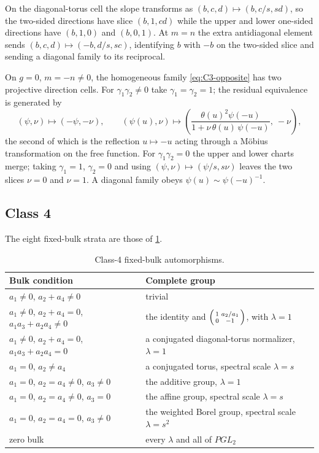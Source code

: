 \documentclass[11pt,reqno]{amsart}
\theoremstyle{plain}
\theoremstyle{definition}
\theoremstyle{remark}
\numberwithin{equation}{section}
\begin{document}
On the diagonal-torus cell the slope transforms as $(b,c,d)\mapsto(b,c/s,sd)$, so
the two-sided directions have slice $(b,1,cd)$ while the upper and lower one-sided
directions have $(b,1,0)$ and $(b,0,1)$. At $m=n$ the extra antidiagonal element
sends $(b,c,d)\mapsto(-b,d/s,sc)$, identifying $b$ with $-b$ on the two-sided
slice and sending a diagonal family to its reciprocal.

On $g=0$, $m=-n\ne0$, the homogeneous family \cref{eq:C3-opposite} has two
projective direction cells. For $\gamma_1\gamma_2\ne0$ take $\gamma_1=\gamma_2=1$;
the residual equivalence is generated by
\begin{equation}
(\psi,\nu)\mapsto(-\psi,-\nu),
\qquad
(\psi(u),\nu)\mapsto
\left(\frac{\theta(u)^2\psi(-u)}{1+\nu\,\theta(u)\,\psi(-u)},\ -\nu\right),
\label{eq:C3-residual}
\end{equation}
the second of which is the reflection $u\mapsto-u$ acting through a Möbius
transformation on the free function. For $\gamma_1\gamma_2=0$ the upper and lower
charts merge; taking $\gamma_1=1$, $\gamma_2=0$ and using
$(\psi,\nu)\mapsto(\psi/s,s\nu)$ leaves the two slices $\nu=0$ and $\nu=1$. A
diagonal family obeys $\psi(u)\sim\psi(-u)^{-1}$.

\subsection{Class 4}

The eight fixed-bulk strata are those of \cref{tab:C4-aut}.

\begin{table}[t]
\centering\footnotesize
\caption{Class-4 fixed-bulk automorphisms.}
\label{tab:C4-aut}
\begin{tabularx}{\textwidth}{>{\RaggedRight\arraybackslash}X >{\RaggedRight\arraybackslash}X}
\toprule
Bulk condition & Complete group \\
\midrule
$a_1\ne0$, $a_2+a_4\ne0$ & trivial \\
$a_1\ne0$, $a_2+a_4=0$, $a_1a_3+a_2a_4\ne0$ & the identity and $\begin{psmallmatrix}1&a_2/a_1\\0&-1\end{psmallmatrix}$, with $\lambda=1$ \\
$a_1\ne0$, $a_2+a_4=0$, $a_1a_3+a_2a_4=0$ & a conjugated diagonal-torus normalizer, $\lambda=1$ \\
$a_1=0$, $a_2\ne a_4$ & a conjugated torus, spectral scale $\lambda=s$ \\
$a_1=0$, $a_2=a_4\ne0$, $a_3\ne0$ & the additive group, $\lambda=1$ \\
$a_1=0$, $a_2=a_4\ne0$, $a_3=0$ & the affine group, spectral scale $\lambda=s$ \\
$a_1=0$, $a_2=a_4=0$, $a_3\ne0$ & the weighted Borel group, spectral scale $\lambda=s^2$ \\
zero bulk & every $\lambda$ and all of $PGL_2$ \\
\bottomrule
\end{tabularx}
\end{table}
\end{document}
